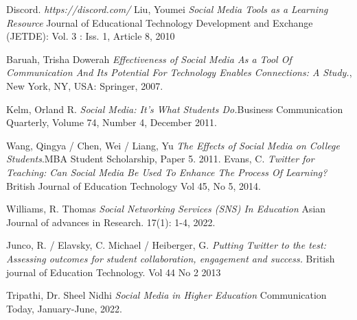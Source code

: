 \documentclass[lettersize,journal]{IEEEtran}
\begin{document}
\begin{thebibliography}{}

	Discord. {\it{https://discord.com/}}
        Liu, Youmei {\it{Social Media Tools as a Learning Resource}} Journal of Educational Technology Development and Exchange (JETDE): Vol. 3 : Iss. 1, Article 8, 2010

    Baruah, Trisha Dowerah {\it{Effectiveness of Social Media As a Tool Of Communication And Its Potential For Technology Enables Connections: A Study.}}, New York, NY, USA: Springer, 2007.

    Kelm, Orland R. {\it{Social Media: It's What Students Do.}}Business Communication Quarterly, Volume 74, Number 4, December 2011.

        Wang, Qingya / Chen, Wei / Liang, Yu {\it{The Effects of Social Media on College Students}}.MBA Student Scholarship, Paper 5. 2011.
        Evans, C. {\it{Twitter for Teaching: Can Social Media Be Used To Enhance The Process Of Learning?}} British Journal of Education Technology
Vol 45, No 5, 2014.

        Williams, R. Thomas {\it{Social Networking Services (SNS) In Education}}
        Asian Journal of advances in Research. 17(1): 1-4, 2022.

        Junco, R. / Elavsky, C. Michael / Heiberger, G. {\it{Putting Twitter to
        the test: Assessing outcomes for student collaboration, engagement and
        success.}} British journal of Education Technology. Vol 44 No 2 2013

        Tripathi, Dr. Sheel Nidhi {\it{Social Media in Higher Education}}
        Communication Today, January-June, 2022.


\end{thebibliography}
\end{document}
